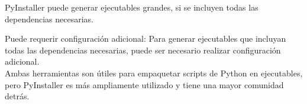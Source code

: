 {\ttfamily PyInstaller} puede generar ejecutables grandes, si se incluyen todas las dependencias necesarias.

Puede requerir configuración adicional: Para generar ejecutables que incluyan todas las dependencias necesarias,
puede ser necesario realizar configuración adicional.\\

Ambas herramientas son útiles para empaquetar scripts de Python en ejecutables, pero PyInstaller es más ampliamente utilizado y tiene una mayor comunidad detrás.



